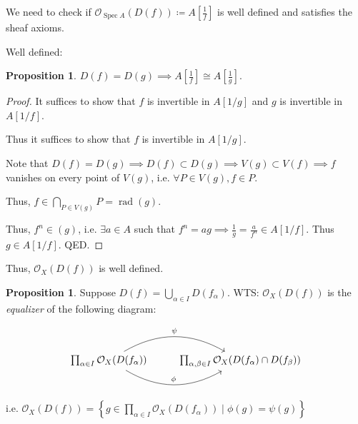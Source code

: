 \documentclass{article}
\theoremstyle{definition}
\newtheorem{proposition}[theorem]{Proposition}
\begin{document}
    We need to check if \(\mathcal{O}_{\operatorname{Spec} A}(D(f)) \coloneqq A \left[ \frac{1}{f} \right]\) is well defined and satisfies the sheaf axioms.
    
    Well defined:

    \begin{proposition}
        \(D(f) = D(g) \implies A \left[ \frac{1}{f} \right] \cong A \left[ \frac{1}{g} \right]\).
    \end{proposition}

    \begin{proof}
        It suffices to show that \(f\) is invertible in \(A[1 / g]\) and \(g \) is invertible in \(A[1 / f]\).

        Thus it suffices to show that \(f\) is invertible in \(A[1 / g]\).

        Note that \(D(f) = D(g) \implies D(f) \subset D(g)  \implies V(g) \subset V(f) \implies f\) vanishes on every point of \(V(g)\), i.e. \(\forall P \in V(g), f\in P\).

        Thus, \(f\in \bigcap_{P\in V(g)} P = \operatorname{rad} (g)\).

        Thus, \(f^n \in (g)\), i.e. \(\exists a\in A\) such that \(f^n = ag \implies \frac{1}{g} = \frac{a}{f^n} \in A[1 / f]\). Thus \(g\in A[1 / f]\). QED.  
    \end{proof}

    Thus, \(\mathcal{O}_X(D(f))\) is well defined. 
    
    \begin{proposition}
        Suppose \(D(f) = \bigcup_{\alpha \in I} D(f_\alpha)\). WTS: \(\mathcal{O}_X(D(f))\) is the \textit{equalizer} of the following diagram:

        \[
            \begin{tikzcd}
                \prod_{\alpha \in I} \mathcal{O}_X (D(f_\alpha)) \ar[r, bend right,"\phi"] \ar[r, bend left,"\psi"] & \prod_{\alpha,\beta \in I} \mathcal{O}_X(D(f_\alpha)\cap D(f_\beta))
            \end{tikzcd}
        \]

        i.e. \(\mathcal{O}_X(D(f)) = \left\{ g \in \prod_{\alpha \in I} \mathcal{O}_X(D(f_\alpha)) \mid \phi(g) = \psi(g)  \right\} \) 
    \end{proposition}
\end{document}
